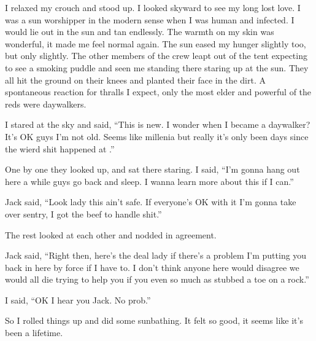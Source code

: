I relaxed my crouch and stood up. I looked skyward to see my long lost love. I was a sun worshipper in the  modern sense when I was human and infected. I would lie out in the sun and tan endlessly. The warmth on my skin was wonderful, it made me feel normal again. The sun eased my hunger slightly too, but only slightly. The other members of the crew leapt out of the tent expecting to see a smoking puddle and seen me standing there staring up at the sun. They all hit the ground on their knees and planted their face in the dirt. A spontaneous reaction for thralls I expect, only the most elder and powerful of the reds were daywalkers.

I stared at the sky and said, ``This is new. I wonder when I became a daywalker? It's OK guys I'm not old. Seems like millenia but really it's only been days since the wierd shit happened at \chichenitza*.''

One by one they looked up, and sat there staring. I said, ``I'm gonna hang out here a while guys go back and sleep. I wanna learn more about this if I can.''

Jack said, ``Look lady this ain't safe. If everyone's OK with it I'm gonna take over sentry, I got the beef to handle shit.''

The rest looked at each other and nodded in agreement.

Jack said, ``Right then, here's the deal lady if there's a problem I'm putting you back in here by force if I have to. I don't think anyone here would disagree we would all die trying to help you if you even so much as stubbed a toe on a rock.''

I said, ``OK I hear you Jack. No prob.''

So I rolled things up and did some sunbathing. It felt so good, it seems like it's been a lifetime.

